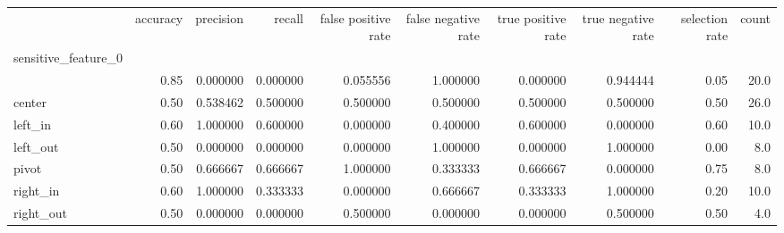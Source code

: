 \begin{tabular}{lrrrrrrrrr}
\toprule
{} &  accuracy &  precision &    recall &  false positive rate &  false negative rate &  true positive rate &  true negative rate &  selection rate &  count \\
sensitive\_feature\_0 &           &            &           &                      &                      &                     &                     &                 &        \\
\midrule
                    &      0.85 &   0.000000 &  0.000000 &             0.055556 &             1.000000 &            0.000000 &            0.944444 &            0.05 &   20.0 \\
center              &      0.50 &   0.538462 &  0.500000 &             0.500000 &             0.500000 &            0.500000 &            0.500000 &            0.50 &   26.0 \\
left\_in             &      0.60 &   1.000000 &  0.600000 &             0.000000 &             0.400000 &            0.600000 &            0.000000 &            0.60 &   10.0 \\
left\_out            &      0.50 &   0.000000 &  0.000000 &             0.000000 &             1.000000 &            0.000000 &            1.000000 &            0.00 &    8.0 \\
pivot               &      0.50 &   0.666667 &  0.666667 &             1.000000 &             0.333333 &            0.666667 &            0.000000 &            0.75 &    8.0 \\
right\_in            &      0.60 &   1.000000 &  0.333333 &             0.000000 &             0.666667 &            0.333333 &            1.000000 &            0.20 &   10.0 \\
right\_out           &      0.50 &   0.000000 &  0.000000 &             0.500000 &             0.000000 &            0.000000 &            0.500000 &            0.50 &    4.0 \\
\bottomrule
\end{tabular}
